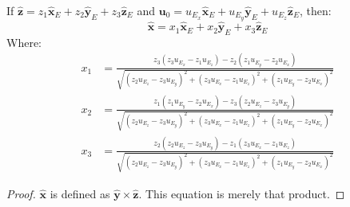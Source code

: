 \documentclass[crop=false,class=article,oneside]{standalone}
\begin{document}
        \begin{theorem}
            If
            $\hat{\mathbf{z}}%
             =z_{1}\hat{\mathbf{x}}_{E}+%
              z_{2}\hat{\mathbf{y}}_{E}+%
              z_{3}\hat{\mathbf{z}}_{E}$
            and
            $\mathbf{u}_{0}%
             = u_{E_{x}}\hat{\mathbf{x}}_{E}+%
              u_{E_{y}}\hat{\mathbf{y}}_{E}+%
              u_{E_{z}}\hat{\mathbf{z}}_{E}$,
             then:
            \begin{equation*}
                \hat{\mathbf{x}}=
                    x_{1}\hat{\mathbf{x}}_{E}+
                    x_{2}\hat{\mathbf{y}}_{E}+
                    x_{3}\hat{\mathbf{z}}_{E}
            \end{equation*}
            Where:
            \begin{align*}
                x_1
                &=\frac{z_{3}(z_{3}u_{E_{x}}-
                        z_{1}u_{E_{z}})-z_{2}(z_{1}u_{E_{y}}-
                        z_{2}u_{E_{x}})}
                       {\sqrt{(z_{2}u_{E_{z}}-
                        z_{3}u_{E_{y}})^{2}+
                        (z_{3}u_{E_{x}}-z_{1}u_{E_{z}})^{2}+
                        (z_{1}u_{E_{y}}-z_{2}u_{E_{x}})^{2}}}\\
                x_2
                &=\frac{z_{1}(z_{1}u_{E_{y}}-
                        z_{2}u_{E_{x}})-z_{3}(z_{2}u_{E_{z}}-
                        z_{3}u_{E_{y}})}
                       {\sqrt{(z_{2}u_{E_{z}}-z_{3}u_{E_{y}})^{2}+
                        (z_{3}u_{E_{x}}-z_{1}u_{E_{z}})^{2}+
                        (z_{1}u_{E_{y}}-z_{2}u_{E_{x}})^{2}}}\\
                x_3
                &=\frac{z_{2}(z_{2}u_{E_{z}}-
                        z_{3}u_{E_{y}})-z_{1}(z_{3}u_{E_{x}}-
                        z_{1}u_{E_{z}})}
                       {\sqrt{(z_{2}u_{E_{z}}-z_{3}u_{E_{y}})^{2}+
                        (z_{3}u_{E_{x}}-z_{1}u_{E_{z}})^{2}+
                        (z_{1}u_{E_{y}}-z_{2}u_{E_{x}})^{2}}}
            \end{align*}
            \end{theorem}
        \begin{proof}
            $\hat{\mathbf{x}}$ is defined as
            $\hat{\mathbf{y}}\times\hat{\mathbf{z}}$.
            This equation is merely that product.
        \end{proof}
\end{document}
